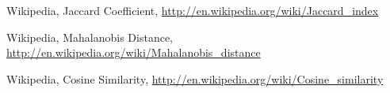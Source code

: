 	Wikipedia, Jaccard Coefficient, 
	\url{http://en.wikipedia.org/wiki/Jaccard_index}
	
	Wikipedia, Mahalanobis Distance, 
	\url{http://en.wikipedia.org/wiki/Mahalanobis_distance}
	
	Wikipedia, Cosine Similarity, 
	\url{http://en.wikipedia.org/wiki/Cosine_similarity}